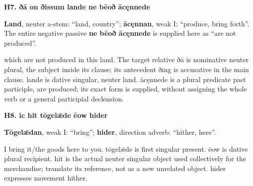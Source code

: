 \par\begin{minipage}{\linewidth}\raggedright
\textbf{H7. ðā on ðissum lande ne bēoð ācęnnede}

\textbf{Land}, neuter a-stem: “land, country”; \textbf{ācęnnan}, weak I: “produce, bring forth”. The entire negative passive \textbf{ne bēoð ācęnnede} is supplied here as “are not produced”.

which are not produced in this land. The target relative ðā is nominative neuter plural, the subject inside its clause; its antecedent ðing is accusative in the main clause. lande is dative singular, neuter land. ācęnnede is a plural predicate past participle, are produced; its exact form is supplied, without assigning the whole verb or a general participial declension.

\end{minipage}\par\addvspace{4pt}

\par\begin{minipage}{\linewidth}\raggedright
\textbf{H8. ic hit tōgelǣde ēow hider}

\textbf{Tōgelǣdan}, weak I: “bring”; \textbf{hider}, direction adverb: “hither, here”.

I bring it/\allowbreak{}the goods here to you. tōgelǣde is first singular present. ēow is dative plural recipient. hit is the actual neuter singular object used collectively for the merchandise; translate its reference, not as a new unrelated object. hider expresses movement hither.

\end{minipage}\par\addvspace{4pt}

